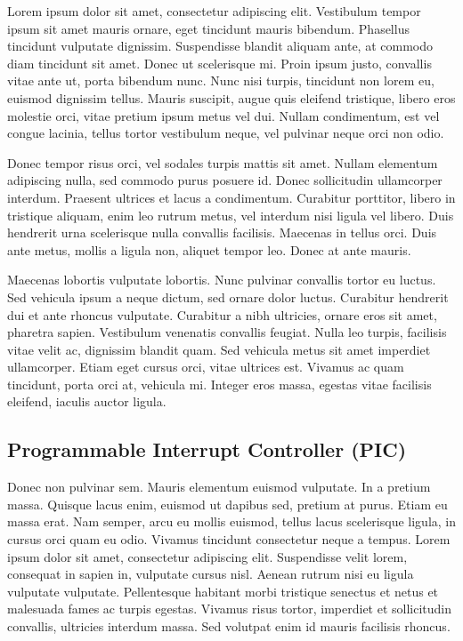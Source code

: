 \documentclass[a4paper,twocolumn,12pt]{article}
\begin{document}
 Lorem ipsum dolor sit amet, consectetur adipiscing elit. Vestibulum tempor ipsum sit amet mauris ornare, eget tincidunt mauris bibendum. Phasellus tincidunt vulputate dignissim. Suspendisse blandit aliquam ante, at commodo diam tincidunt sit amet. Donec ut scelerisque mi. Proin ipsum justo, convallis vitae ante ut, porta bibendum nunc. Nunc nisi turpis, tincidunt non lorem eu, euismod dignissim tellus. Mauris suscipit, augue quis eleifend tristique, libero eros molestie orci, vitae pretium ipsum metus vel dui. Nullam condimentum, est vel congue lacinia, tellus tortor vestibulum neque, vel pulvinar neque orci non odio.

Donec tempor risus orci, vel sodales turpis mattis sit amet. Nullam elementum adipiscing nulla, sed commodo purus posuere id. Donec sollicitudin ullamcorper interdum. Praesent ultrices et lacus a condimentum. Curabitur porttitor, libero in tristique aliquam, enim leo rutrum metus, vel interdum nisi ligula vel libero. Duis hendrerit urna scelerisque nulla convallis facilisis. Maecenas in tellus orci. Duis ante metus, mollis a ligula non, aliquet tempor leo. Donec at ante mauris.

Maecenas lobortis vulputate lobortis. Nunc pulvinar convallis tortor eu luctus. Sed vehicula ipsum a neque dictum, sed ornare dolor luctus. Curabitur hendrerit dui et ante rhoncus vulputate. Curabitur a nibh ultricies, ornare eros sit amet, pharetra sapien. Vestibulum venenatis convallis feugiat. Nulla leo turpis, facilisis vitae velit ac, dignissim blandit quam. Sed vehicula metus sit amet imperdiet ullamcorper. Etiam eget cursus orci, vitae ultrices est. Vivamus ac quam tincidunt, porta orci at, vehicula mi. Integer eros massa, egestas vitae facilisis eleifend, iaculis auctor ligula. 

\subsection{Programmable Interrupt Controller (PIC)}

Donec non pulvinar sem. Mauris elementum euismod vulputate. In a pretium massa. Quisque lacus enim, euismod ut dapibus sed, pretium at purus. Etiam eu massa erat. Nam semper, arcu eu mollis euismod, tellus lacus scelerisque ligula, in cursus orci quam eu odio. Vivamus tincidunt consectetur neque a tempus. Lorem ipsum dolor sit amet, consectetur adipiscing elit. Suspendisse velit lorem, consequat in sapien in, vulputate cursus nisl. Aenean rutrum nisi eu ligula vulputate vulputate. Pellentesque habitant morbi tristique senectus et netus et malesuada fames ac turpis egestas. Vivamus risus tortor, imperdiet et sollicitudin convallis, ultricies interdum massa. Sed volutpat enim id mauris facilisis rhoncus.
\end{document}
